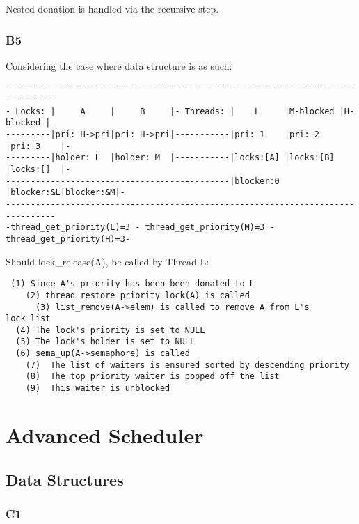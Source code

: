 \documentclass[a4wide, 11pt]{article}
\begin{document}
Nested donation is handled via the recursive step.

\subsubsection{B5}

Considering the case where data structure is as such:

\begin{verbatim}
--------------------------------------------------------------------------------
- Locks: |     A     |     B     |- Threads: |    L     |M-blocked |H-blocked |-
---------|pri: H->pri|pri: H->pri|-----------|pri: 1    |pri: 2    |pri: 3    |-
---------|holder: L  |holder: M  |-----------|locks:[A] |locks:[B] |locks:[]  |-
---------------------------------------------|blocker:0 |blocker:&L|blocker:&M|-
--------------------------------------------------------------------------------
-thread_get_priority(L)=3 - thread_get_priority(M)=3 - thread_get_priority(H)=3-
\end{verbatim}

Should lock\_release(A), be called by Thread L:
\begin{verbatim}
 (1) Since A's priority has been been donated to L
    (2) thread_restore_priority_lock(A) is called
      (3) list_remove(A->elem) is called to remove A from L's lock_list
  (4) The lock's priority is set to NULL
  (5) The lock's holder is set to NULL
  (6) sema_up(A->semaphore) is called
    (7)  The list of waiters is ensured sorted by descending priority
    (8)  The top priority waiter is popped off the list
    (9)  This waiter is unblocked
\end{verbatim}

\section{Advanced Scheduler}
\subsection{Data Structures}
\subsubsection{C1}
\end{document}
